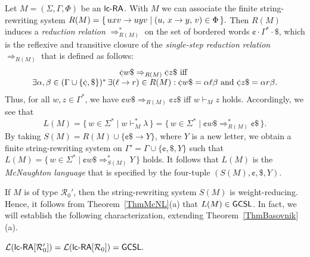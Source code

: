Let $M = (\Sigma,\Gamma,\Phi)$ be an $\lcRA$. With $M$ we can associate the finite string-rewriting system $R(M) = \{\,uxv\to uyv\mid (u,\,x\rightarrow y,\,v)\in \Phi\,\}.$ Then $R(M)$ induces a \emph{reduction relation} $\Rightarrow_{R(M)}^*$ on the set of bordered words $\cent\cdot\Gamma^*\cdot\$$, which is the reflexive and transitive closure of the \emph{single-step reduction relation} $\Rightarrow_{R(M)}$ 
that is defined as follows:
$$\begin{array}{c}
\cent w\$\Rightarrow_{R(M)}\cent z\$
\text{ iff }\\
\exists \alpha,\beta\in(\Gamma\cup\{\cent,\$\})^*\,\exists (\ell\to r)\in R(M):
   \cent w\$ = \alpha \ell\beta \textup{ and } \cent z\$ = \alpha r\beta.
\end{array}$$
Thus, for all $w,z\in\Gamma^*$, we have $\cent w\$ \Rightarrow_{R(M)}\cent z\$$ iff $w \vdash_M z$ holds. Accordingly, we see that
$$L(M) = \{\,w\in\Sigma^*\mid w\vdash_M^*\lambda\,\}
       = \{\,w\in\Sigma^*\mid \cent w\$\Rightarrow_{R(M)}^*\cent \$\,\}.$$
By taking $S(M) = R(M) \cup \{\cent \$\to Y\}$, where $Y$ is a new letter, we obtain a finite string-rewriting system on $\Gamma'=\Gamma\cup\{\cent,\$,Y\}$ such that $L(M) = \{\,w\in\Sigma^*\mid \cent w\$ \Rightarrow_{S(M)}^*Y\,\}$ holds. It follows that $L(M)$ is the \emph{McNaughton language} that is specified by the four-tuple $(S(M),\cent,\$,Y)$.
\vspace{+0.2cm}

If $M$ is of type $\mathcal{R}_0'$, then the string-rewriting system $S(M)$ is weight-reducing. Hence, it follows from Theorem~\ref{ThmMcNL}(a) that $L(M)\in\textup{\sf GCSL}$. In fact, we will establish the following characterization, extending Theorem~\ref{ThmBasovnik}(a).

\begin{theorem}\label{PropR0}
${\mathcal L}(\lcRAp[0]) = {\mathcal L}(\lcRA[0]) =  \GCSL.$
\end{theorem}


